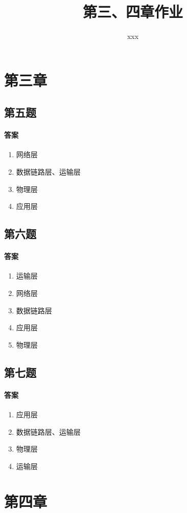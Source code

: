 \documentclass[UTF8]{article}
\title{第三、四章作业}
\author{xxx}
\begin{document}
\date{}
\maketitle
\section{第三章}
\subsection{第五题}
\paragraph{答案}
\begin{enumerate}[a]
    \item 网络层
    \item 数据链路层、运输层
    \item 物理层
    \item 应用层
\end{enumerate}
\subsection{第六题}
\paragraph{答案}
\begin{enumerate}[a]
    \item 运输层
    \item 网络层
    \item 数据链路层
    \item 应用层
    \item 物理层
\end{enumerate}
\subsection{第七题}
\paragraph{答案}
\begin{enumerate}[a]
    \item 应用层
    \item 数据链路层、运输层
    \item 物理层
    \item 运输层
\end{enumerate}
\section{第四章}
\end{document}
